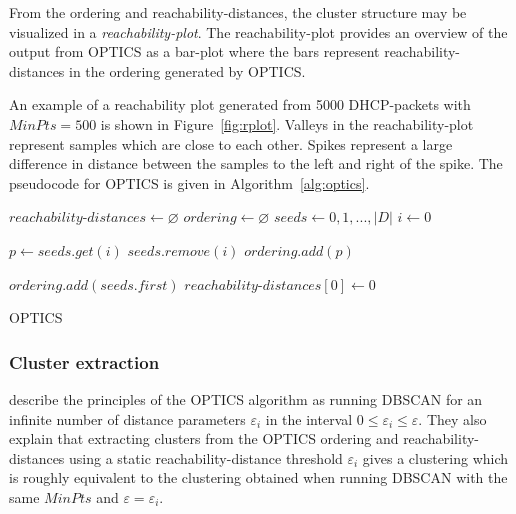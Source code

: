 \documentclass[a4paper]{report}
\begin{document}
From the ordering and reachability-distances, the cluster structure may be
visualized in a \emph{reachability-plot}. The reachability-plot provides an
overview of the output from OPTICS as a bar-plot where the bars represent
reachability-distances in the ordering generated by OPTICS.

An example of a reachability plot generated from 5000 DHCP-packets with
$MinPts = 500$ is shown in Figure~\ref{fig:rplot}. Valleys in the
reachability-plot represent samples which are close to each other. Spikes
represent a large difference in distance between the samples to the left and
right of the spike. The pseudocode for OPTICS is given in
Algorithm~\ref{alg:optics}.
\\
{
    \fontsize{10}{12}
    \selectfont
    \begin{algorithm}[H]
        \DontPrintSemicolon
        \BlankLine
        \BlankLine

        $reachability$-$distances \gets \varnothing$\;
        $ordering \gets \varnothing$\;
        $seeds \gets 0,1,...,|D|$\;
        $i \gets 0$\;

         {
            $p \gets seeds.get(i)$\;
            $seeds.remove(i)$\;
            $ordering.add(p)$\;

        }
        \;
        $ordering.add(seeds.first)$\;
        $reachability$-$distances[0] \gets 0$\;
        \BlankLine
        \caption{OPTICS}
        \label{alg:optics}
    \end{algorithm}
}

\subsubsection{Cluster extraction}

\citeauthor{ankerst99} describe the principles of the OPTICS algorithm as
running DBSCAN for an infinite number of distance parameters $\varepsilon_i$
in the interval $0 \le \varepsilon_i \le \varepsilon$. They also explain that
extracting clusters from the OPTICS ordering and reachability-distances using
a static reachability-distance threshold $\varepsilon_i$ gives a clustering
which is roughly equivalent to the clustering obtained when running DBSCAN
with the same $MinPts$ and $\varepsilon = \varepsilon_i$.
\end{document}
